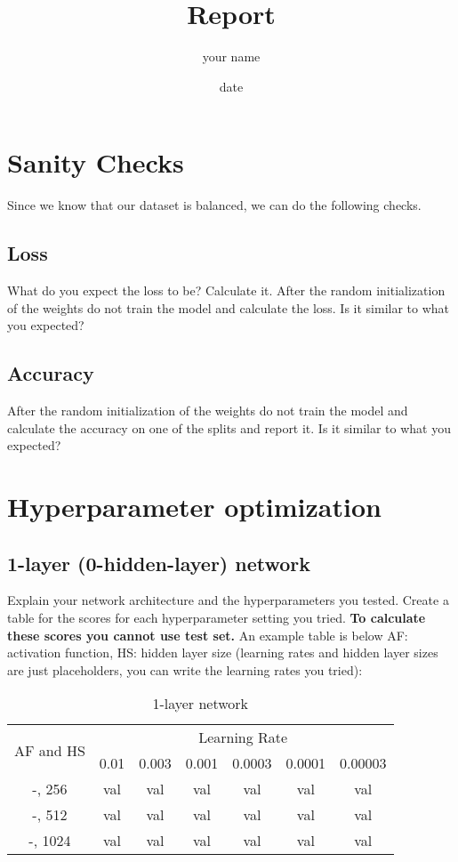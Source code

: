 \documentclass{article}
\title{Report}
\author{your name}
\date{date}
\begin{document}
\maketitle

\section{Sanity Checks}
Since we know that our dataset is balanced, we can do the following checks.
\subsection{Loss}
What do you expect the loss to be? Calculate it.
After the random initialization of the weights do not train the model and calculate the loss. Is it similar to what you expected?
\subsection{Accuracy}
After the random initialization of the weights do not train the model and calculate the accuracy on one of the splits and report it. Is it similar to what you expected?

\section{Hyperparameter optimization}

\subsection{1-layer (0-hidden-layer) network}
Explain your network architecture and the hyperparameters you tested. Create a table for the scores for each hyperparameter setting you tried. \textbf{To calculate these scores you cannot use test set.} An example table is below AF: activation function, HS: hidden layer size (learning rates and hidden layer sizes are just placeholders, you can write the learning rates you tried):\\
\begin{table}[htbp]
    \centering
    \begin{tabular}{|c|c|c|c|c|c|c|}
    \hline
    \multirow{2}{5em}{AF and HS} & \multicolumn{6}{c|}{Learning Rate} \\
        & 0.01 & 0.003 & 0.001 & 0.0003 & 0.0001 & 0.00003 \\
        \hline \hline
        -, 256  & val & val & val & val & val & val \\
        -, 512  & val & val & val & val & val & val \\
        -, 1024  & val & val & val & val & val & val \\
        \hline
    \end{tabular}
    \caption{1-layer network}
    \label{tab:1layer}
\end{table}
\end{document}
